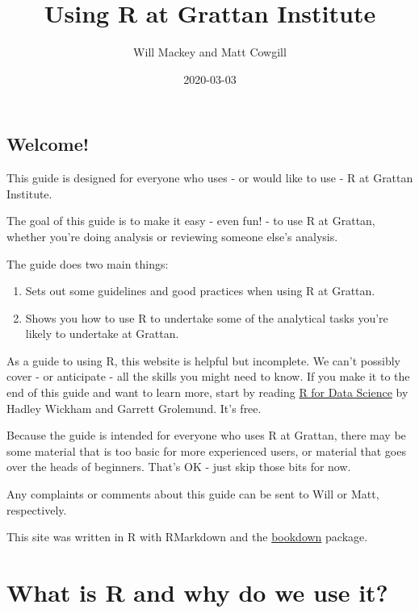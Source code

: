 \documentclass[]{book}
\title{Using R at Grattan Institute}
\author{Will Mackey and Matt Cowgill}
\date{2020-03-03}
\providecommand{\tightlist}{%
  \setlength{\itemsep}{0pt}\setlength{\parskip}{0pt}}
\begin{document}
\maketitle

{
\setcounter{tocdepth}{1}
\tableofcontents
}
\hypertarget{welcome}{%
\chapter*{Welcome!}\label{welcome}}

This guide is designed for everyone who uses - or would like to use - R at Grattan Institute.

The goal of this guide is to make it easy - even fun! - to use R at Grattan, whether you're doing analysis or reviewing someone else's analysis.

The guide does two main things:

\begin{enumerate}
\def\labelenumi{\arabic{enumi}.}
\tightlist
\item
  Sets out some guidelines and good practices when using R at Grattan.
\item
  Shows you how to use R to undertake some of the analytical tasks you're likely to undertake at Grattan.
\end{enumerate}

As a guide to using R, this website is helpful but incomplete. We can't possibly cover - or anticipate - all the skills you might need to know. If you make it to the end of this guide and want to learn more, start by reading \href{https://r4ds.had.co.nz}{R for Data Science} by Hadley Wickham and Garrett Grolemund. It's free.

Because the guide is intended for everyone who uses R at Grattan, there may be some material that is too basic for more experienced users, or material that goes over the heads of beginners. That's OK - just skip those bits for now.

Any complaints or comments about this guide can be sent to Will or Matt, respectively.

This site was written in R with RMarkdown and the \href{https://bookdown.org}{bookdown} package.

\hypertarget{part-what-is-r-and-why-do-we-use-it}{%
\part{What is R and why do we use it?}\label{part-what-is-r-and-why-do-we-use-it}}
\end{document}
